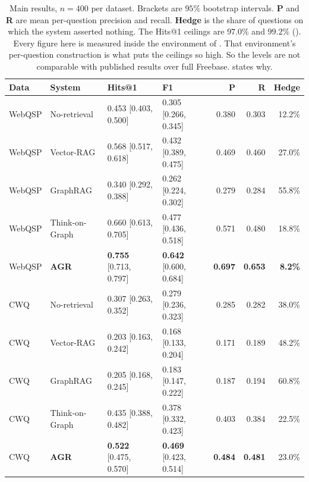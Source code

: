 \begin{table}[!tb]
  \begin{center}
    \caption[Main results on both test sets]{Main results, $n = 400$ per
    dataset. Brackets are $95\%$ bootstrap intervals. \textbf{P} and \textbf{R}
    are mean per-question precision and recall. \textbf{Hedge} is the share of
    questions on which the system asserted nothing. The Hits@1 ceilings are
    $97.0\%$ and $99.2\%$ (). Every figure here is measured
    inside the environment of . That environment's
    per-question construction is what puts the ceilings so high. So the levels
    are not comparable with published results over full Freebase.
     states why.}
    \label{tab:main}
    \small
    \setlength{\tabcolsep}{5pt}
    \begin{tabular}{|l|l|l|l|r|r|r|}
      \hline
      \textbf{Data} & \textbf{System} & \textbf{Hits@1} & \textbf{F1} &
      \textbf{P} & \textbf{R} & \textbf{Hedge} \\
      \hline
      WebQSP & No-retrieval  & 0.453 [0.403, 0.500] & 0.305 [0.266, 0.345] &
        0.380 & 0.303 & 12.2\% \\
      WebQSP & Vector-RAG    & 0.568 [0.517, 0.618] & 0.432 [0.389, 0.475] &
        0.469 & 0.460 & 27.0\% \\
      WebQSP & GraphRAG      & 0.340 [0.292, 0.388] & 0.262 [0.224, 0.302] &
        0.279 & 0.284 & 55.8\% \\
      WebQSP & Think-on-Graph & 0.660 [0.613, 0.705] & 0.477 [0.436, 0.518] &
        0.571 & 0.480 & 18.8\% \\
      WebQSP & \textbf{AGR}  & \textbf{0.755} [0.713, 0.797] & \textbf{0.642}
        [0.600, 0.684] & \textbf{0.697} & \textbf{0.653} & \textbf{8.2\%} \\
      \hline
      CWQ & No-retrieval  & 0.307 [0.263, 0.352] & 0.279 [0.236, 0.323] & 0.285
        & 0.282 & 38.0\% \\
      CWQ & Vector-RAG    & 0.203 [0.163, 0.242] & 0.168 [0.133, 0.204] & 0.171
        & 0.189 & 48.2\% \\
      CWQ & GraphRAG      & 0.205 [0.168, 0.245] & 0.183 [0.147, 0.222] & 0.187
        & 0.194 & 60.8\% \\
      CWQ & Think-on-Graph & 0.435 [0.388, 0.482] & 0.378 [0.332, 0.423] & 0.403
        & 0.384 & 22.5\% \\
      CWQ & \textbf{AGR}  & \textbf{0.522} [0.475, 0.570] & \textbf{0.469}
        [0.423, 0.514] & \textbf{0.484} & \textbf{0.481} & 23.0\% \\
      \hline
    \end{tabular}
  \end{center}
\end{table}

